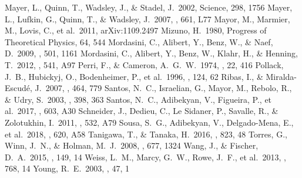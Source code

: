 \documentclass[twocolumn, dvipdfmx]{aastex62}
\begin{document}
\begin{CJK*}{UTF8}{min}
\begin{thebibliography}{}
 Mayer, L., Quinn, T., Wadsley, J., \& Stadel, J.\ 2002, Science, 298, 1756
 Mayer, L., Lufkin, G., Quinn, T., \& Wadsley, J.\ 2007, \apjl, 661, L77
 Mayor, M., Marmier, M., Lovis, C., et al.\ 2011, arXiv:1109.2497
 Mizuno, H.\ 1980, Progress of Theoretical Physics, 64, 544
 Mordasini, C., Alibert, Y., Benz, W., \& Naef, D.\ 2009, \aap, 501, 1161
 Mordasini, C., Alibert, Y., Benz, W., Klahr, H., \& Henning, T.\ 2012, \aap, 541, A97
 Perri, F., \& Cameron, A.~G.~W.\ 1974, \icarus, 22, 416
 Pollack, J.~B., Hubickyj, O., Bodenheimer, P., et al.\ 1996, \icarus, 124, 62
 Ribas, I., \& Miralda-Escud{\'e}, J.\ 2007, \aap, 464, 779
 Santos, N.~C., Israelian, G., Mayor, M., Rebolo, R., \& Udry, S.\ 2003, \aap, 398, 363
 Santos, N.~C., Adibekyan, V., Figueira, P., et al.\ 2017, \aap, 603, A30
 Schneider, J., Dedieu, C., Le Sidaner, P., Savalle, R., \& Zolotukhin, I.\ 2011, \aap, 532, A79
 Sousa, S.~G., Adibekyan, V., Delgado-Mena, E., et al.\ 2018, \aap, 620, A58
 Tanigawa, T., \& Tanaka, H.\ 2016, \apj, 823, 48
 Torres, G., Winn, J.~N., \& Holman, M.~J.\ 2008, \apj, 677, 1324
 Wang, J., \& Fischer, D.~A.\ 2015, \aj, 149, 14
 Weiss, L.~M., Marcy, G.~W., Rowe, J.~F., et al.\ 2013, \apj, 768, 14
 Young, R.~E.\ 2003, \nar, 47, 1

\end{thebibliography}


\end{CJK*}
\end{document}
